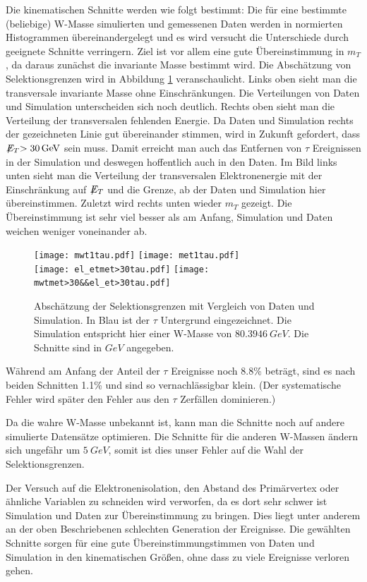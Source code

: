 \documentclass[a4paper,12pt]{article}
\newcommand{\met}{\ensuremath{\not\mathrel{E}}_T}
\begin{document}
Die kinematischen Schnitte werden wie folgt bestimmt:
Die für eine bestimmte (beliebige) W-Masse simulierten und gemessenen Daten werden in normierten Histogrammen übereinandergelegt
und es wird versucht die Unterschiede durch geeignete Schnitte verringern. Ziel ist vor allem eine gute
Übereinstimmung in $m_T$, da daraus zunächst die invariante Masse bestimmt wird. Die Abschätzung von Selektionsgrenzen
wird in Abbildung \ref{fig:abschaetzung} veranschaulicht. Links oben sieht man die transversale
invariante Masse ohne Einschränkungen. Die Verteilungen von Daten und Simulation unterscheiden sich
noch deutlich. Rechts oben sieht man die Verteilung der transversalen
fehlenden Energie. Da Daten und Simulation rechts der gezeichneten Linie gut übereinander stimmen,
wird in Zukunft gefordert, dass $\met > \SI{30}{GeV}$ sein muss. Damit erreicht man auch das
Entfernen von $τ$ Ereignissen in der Simulation und deswegen hoffentlich auch in den Daten. Im Bild links unten sieht man die
Verteilung der transversalen Elektronenergie mit der Einschränkung auf $\met$ und die Grenze, ab der Daten und Simulation hier
übereinstimmen. Zuletzt wird rechts unten wieder $m_T$ gezeigt. Die Übereinstimmung ist sehr viel
besser als am Anfang, Simulation und Daten weichen weniger voneinander ab.

\begin{figure}[h]
	\centering
	\texttt{[image: mwt1tau.pdf]}
	\texttt{[image: met1tau.pdf]}\\
	\texttt{[image: el\_etmet>30tau.pdf]}
	\texttt{[image: mwtmet>30\&\&el\_et>30tau.pdf]}
	\caption{Abschätzung der Selektionsgrenzen mit Vergleich von Daten und Simulation. In Blau ist
	der $τ$ Untergrund eingezeichnet. Die Simulation entspricht hier einer W-Masse von
	$\SI{80.3946}{GeV}$. Die Schnitte sind in $\si{GeV}$ angegeben.}
	\label{fig:abschaetzung}
\end{figure}

Während am Anfang der Anteil der $τ$ Ereignisse noch 8.8\% beträgt, sind es nach beiden
Schnitten 1.1\% und sind so vernachlässigbar klein. (Der systematische  Fehler  wird später den
Fehler aus den $τ$ Zerfällen dominieren.)

Da die wahre W-Masse unbekannt ist, kann man die Schnitte noch auf andere simulierte Datensätze
optimieren. Die Schnitte für die anderen W-Massen ändern sich ungefähr um $\SI{5}{GeV}$, somit ist
dies unser Fehler auf die Wahl der Selektionsgrenzen.

Der Versuch auf die Elektronenisolation, den Abstand des Primärvertex oder ähnliche Variablen zu
schneiden wird verworfen, da es dort sehr schwer ist Simulation und Daten zur Übereinstimmung zu
bringen. Dies liegt unter anderem an der oben Beschriebenen schlechten Generation der Ereignisse.
Die gewählten Schnitte sorgen für eine gute Übereinstimmungstimmen von Daten und Simulation in den
kinematischen Größen, ohne dass zu viele Ereignisse verloren gehen.
\end{document}
